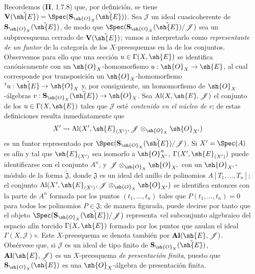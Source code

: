 \begin{env}[18.5.2]
\label{IV.18.5.2}
Recordemos (\textbf{II}, 1.7.8) que, por definición, se tiene $\mathbf V(\check{\sh{E}})=\Spec(\mathbf S_{\sh{O}_X}(\check{\sh{E}}))$. Sea $\mathscr J$ un ideal cuasicoherente de $\mathbf S_{\sh{O}_X}(\check{\sh{E}})$, de modo que $\Spec(\mathbf S_{\sh{O}_X}(\check{\sh{E}})/\mathscr J)$ sea un subpreesquema cerrado de $\mathbf V(\check{\sh{E}})$; vamos a interpretarlo como \emph{representante de un funtor} de la categoría de los $X$-preesquemas en la de los conjuntos. Observemos para ello que una sección $u\in\Gamma(X,\sh{E})$ se identifica canónicamente con un $\sh{O}_X$-homomorfismo $u:\sh{O}_X\to\sh{E}$, al cual corresponde por transposición un $\sh{O}_X$-homomorfismo ${}^t u:\check{\sh{E}}\to\sh{O}_X$ y, por consiguiente, un homomorfismo de $\sh{O}_X$-álgebras $v:\mathbf S_{\sh{O}_X}(\check{\sh{E}})\to\sh{O}_X$. Sea $\operatorname{Al}(X,\sh{E},\mathscr J)$ el conjunto de los $u\in\Gamma(X,\sh{E})$ tales que $\mathscr J$ esté \emph{contenido en el núcleo de} $v$; de estas definiciones resulta inmediatamente que
\[
  X'\leadsto\operatorname{Al}(X',\sh{E}_{(X')},\mathscr J\otimes_{\sh{O}_X}\sh{O}_{X'})
\]
es un funtor representado por $\Spec(\mathbf S_{\sh{O}_X}(\check{\sh{E}})/\mathscr J)$. Si $X'=\Spec(A)$ es afín y tal que $\sh{E}_{(X')}$ sea isomorfo a $\sh{O}_{X'}^n$, $\Gamma(X',\sh{E}_{(X')})$ puede identificarse con el conjunto $A^n$, y $\mathscr J\otimes_{\sh{O}_X}\sh{O}_{X'}$ con un $\sh{O}_{X'}$-módulo de la forma $\widetilde{\mathfrak J}$, donde $\mathfrak J$ es un ideal del anillo de polinomios $A[T_1,\ldots,T_n]$; el conjunto $\operatorname{Al}(X',\sh{E}_{(X')},\mathscr J\otimes_{\sh{O}_X}\sh{O}_{X'})$ se identifica entonces con la parte de $A^n$ formada por los puntos $(t_1,\ldots,t_n)$ tales que $P(t_1,\ldots,t_n)=0$ para todos los polinomios $P\in\mathfrak J$; de manera figurada, puede decirse por tanto que el objeto $\Spec(\mathbf S_{\sh{O}_X}(\check{\sh{E}})/\mathscr J)$ representa «el subconjunto algebraico del espacio afín torcido $\Gamma(X,\sh{E})$ formado por los puntos que anulan el ideal $\Gamma(X,\mathscr J)$». Este $X$-preesquema se denota también por $\mathbf{Al}(\sh{E},\mathscr J)$. Obsérvese que, si $\mathscr J$ es un ideal de tipo finito de $\mathbf S_{\sh{O}_X}(\check{\sh{E}})$, $\mathbf{Al}(\sh{E},\mathscr J)$ es un $X$-preesquema \emph{de presentación finita}, puesto que $\mathbf S_{\sh{O}_X}(\check{\sh{E}})$ es una $\sh{O}_X$-álgebra de presentación finita.
\end{env}

